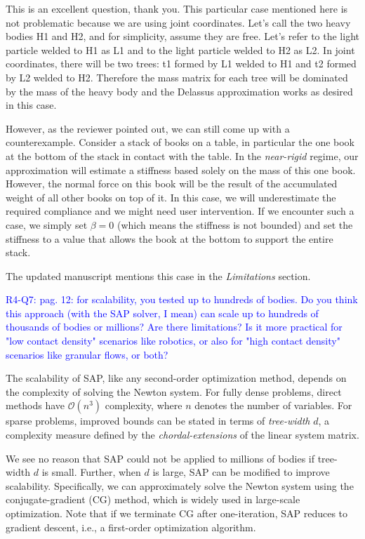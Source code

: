 This is an excellent question, thank you. This particular case mentioned here is
not problematic because we are using joint coordinates. Let's call the two heavy
bodies H1 and H2, and for simplicity, assume they are free. Let's refer to the
light particle welded to H1 as L1 and to the light particle welded to H2 as L2.
In joint coordinates, there will be two trees: t1 formed by L1 welded to H1 and
t2 formed by L2 welded to H2. Therefore the mass matrix for each tree will be
dominated by the mass of the heavy body and the Delassus approximation works
as desired in this case.

However, as the reviewer pointed out, we can still come up with a
counterexample. Consider a stack of books on a table, in particular the one book
at the bottom of the stack in contact with the table. In the \emph{near-rigid}
regime, our approximation will estimate a stiffness based solely on the mass of
this one book. However, the normal force on this book will be the result of the
accumulated weight of all other books on top of it. In this case, we will
underestimate the required compliance and we might need user intervention. 
If we encounter such a case, we simply set $\beta=0$ (which means
the stiffness is not bounded) and set the stiffness to a value that allows the
book at the bottom to support the entire stack.

The updated manuscript mentions this case in the \emph{Limitations} section.

\vspace{5mm}
\textcolor{blue}{R4-Q7: pag. 12: for scalability, you tested up to hundreds of
bodies. Do you think this approach (with the SAP solver, I mean) can scale up to
hundreds of thousands of bodies or millions? Are there limitations? Is it more
practical for "low contact density" scenarios like robotics, or also for "high
contact density" scenarios like granular flows, or both?}

The scalability of SAP, like any second-order optimization method, depends on
the complexity of solving the Newton system. For fully dense problems,
direct methods have $\mathcal{O}(n^3)$ complexity, where $n$
denotes the number of variables.  For sparse problems, improved bounds can be
stated in terms of \emph{tree-width} $d$, a complexity measure defined by the
\emph{chordal-extensions} of the linear system matrix.

We see no reason that SAP could not be applied to millions of bodies if
tree-width $d$ is small.  Further, when $d$ is large, SAP can be modified to improve
scalability.  Specifically, we can approximately solve the Newton system using
the conjugate-gradient (CG) method, which is widely used in large-scale
optimization.  Note that if we terminate CG after one-iteration, SAP reduces to
gradient descent, i.e., a first-order optimization algorithm. 

